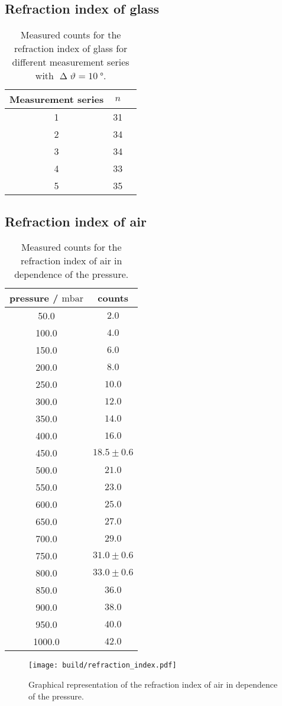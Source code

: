 \subsection{Refraction index of glass}
\label{subsec:refraction_glass}

\begin{table}[htbp]
    \centering
    \begin{tabular}{c c c}
        \toprule
        Measurement series & $n$ \\
        \midrule
        1 & 31 \\
        2 & 34 \\
        3 & 34 \\
        4 & 33 \\
        5 & 35 \\
        \bottomrule
    \end{tabular}
    \caption{Measured counts for the refraction index of glass for different measurement series with $\upDelta \vartheta=\SI{10}{\degree}$.}
    \label{tab:refraction_glass}
\end{table}

\subsection{Refraction index of air}
\label{subsec:refraction_air}

\begin{table}[htbp]
    \centering
    \begin{tabular}{c c}
        \toprule
        pressure / $\si{\milli\bar}$  & counts \\    
        \midrule
        50.0 & $2.0$\\
        100.0 & $4.0$\\
        150.0 & $6.0$\\
        200.0 & $8.0$\\
        250.0 & $10.0$\\
        300.0 & $12.0$\\
        350.0 & $14.0$\\
        400.0 & $16.0$\\
        450.0 & $18.5\pm0.6$\\
        500.0 & $21.0$\\
        550.0 & $23.0$\\
        600.0 & $25.0$\\
        650.0 & $27.0$\\
        700.0 & $29.0$\\
        750.0 & $31.0\pm0.6$\\
        800.0 & $33.0\pm0.6$\\
        850.0 & $36.0$\\
        900.0 & $38.0$\\
        950.0 & $40.0$\\
        1000.0 & $42.0$\\
    \end{tabular}
    \caption{Measured counts for the refraction index of air in dependence of the pressure.}
    \label{tab:refraction_air}
\end{table}

\begin{figure}[H]
    \centering
    \texttt{[image: build/refraction\_index.pdf]}
    \caption{Graphical representation of the refraction index of air in dependence of the pressure.}
    \label{fig:refraction_index}
  \end{figure}